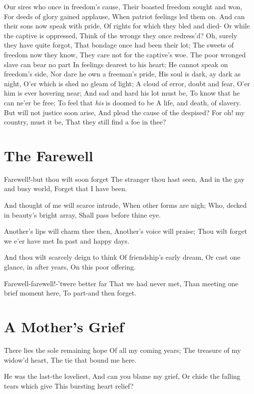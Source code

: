 \documentclass[11pt,a4paper]{article}
\begin{document}
Our sires who once in freedom's cause,
Their boasted freedom sought and won,
For deeds of glory gained applause,
When patriot feelings led them on.
And can their sons now speak with pride,
Of rights for which they bled and died-
Or while the captive is oppressed,
Think of the wrongs they once redress'd?
Oh, surely they have quite forgot,
That bondage once had been their lot;
The sweets of freedom now they know,
They care not for the captive's woe.
The poor wronged slave can bear no part
In feelings dearest to his heart;
He cannot speak on freedom's side,
Nor dare he own a freeman's pride,
His soul is dark, ay dark as night,
O'er which is shed no gleam of light;
A cloud of error, doubt and fear,
O'er him is ever hovering near;
And sad and hard his lot must be,
To know that he can ne'er be free;
To feel that \textit{his} is doomed to be
A life, and death, of slavery.
But will not justice soon arise,
And plead the cause of the despised?
For oh! my country, must it be,
That they still find a foe in thee?

\section{The Farewell}

Farewell!-but thou wilt soon forget
The stranger thou hast seen,
And in the gay and busy world,
Forget that I have been.

And thought of me will scarce intrude,
When other forms are nigh;
Who, decked in beauty's bright array,
Shall pass before thine eye.

Another's lips will charm thee then,
Another's voice will praise;
Thou wilt forget we e'er have met
In past and happy days.

And thou wilt scarcely deign to think
Of friendship's early dream,
Or cast one glance, in after years,
On this poor offering.

Farewell-farewell!-'twere better far
That we had never met,
Than meeting one brief moment here,
To part-and then forget.

\section{A Mother's Grief}

There lies the sole remaining hope
Of all my coming years;
The treasure of my widow'd heart,
The tie that bound me here.

He was the last-the loveliest,
And can you blame my grief,
Or chide the falling tears which give
This bursting heart relief?
\end{document}
